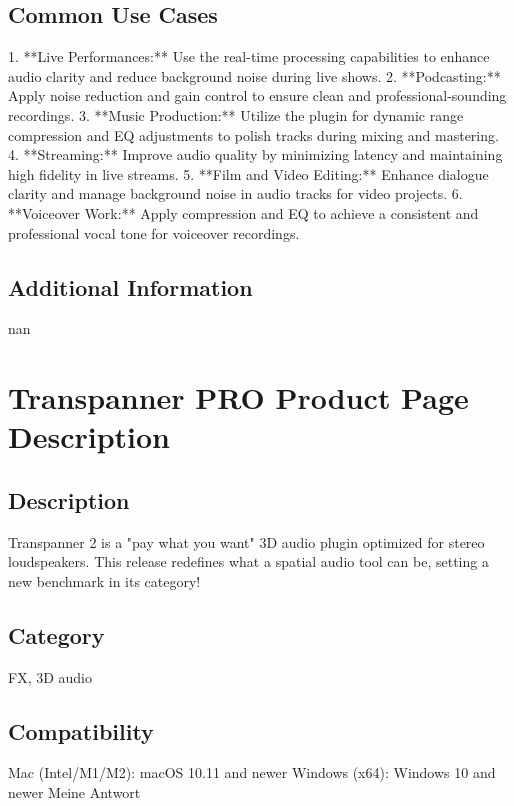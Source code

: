 \documentclass[8pt]{article}
\begin{document}
    \subsection*{Common Use Cases}
    1. **Live Performances:** Use the real-time processing capabilities to enhance audio clarity and reduce background noise during live shows.
2. **Podcasting:** Apply noise reduction and gain control to ensure clean and professional-sounding recordings.
3. **Music Production:** Utilize the plugin for dynamic range compression and EQ adjustments to polish tracks during mixing and mastering.
4. **Streaming:** Improve audio quality by minimizing latency and maintaining high fidelity in live streams.
5. **Film and Video Editing:** Enhance dialogue clarity and manage background noise in audio tracks for video projects.
6. **Voiceover Work:** Apply compression and EQ to achieve a consistent and professional vocal tone for voiceover recordings.

    \subsection*{Additional Information}
    nan
    

    \section*{Transpanner PRO  Product Page Description}

    \subsection*{Description}
    Transpanner 2 is a "pay what you want" 3D audio plugin optimized for stereo loudspeakers. This release redefines what a spatial audio tool can be, setting a new benchmark in its category!

    \subsection*{Category}
    FX, 3D audio

    \subsection*{Compatibility}
    Mac (Intel/M1/M2): macOS 10.11 and newer
Windows (x64): Windows 10 and newer
Meine Antwort
\end{document}
